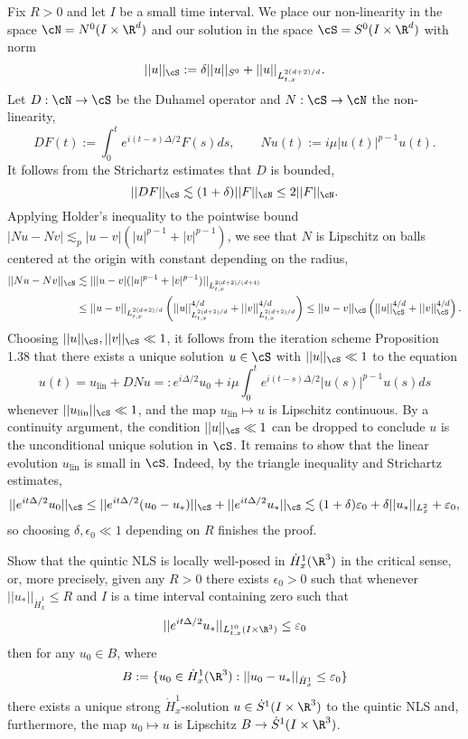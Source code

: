 \begin{solution}
	Fix $R > 0$ and let $I$ be a small time interval. We place our non-linearity in the space $\cN = N^0 (I \times \R^d)$ and our solution in the space $\cS = S^0 (I \times \R^d)$ with norm
		\[ || u||_{\cS} := \delta ||u||_{S^0} + ||u||_{L^{2(d + 2)/d}_{t, x}}. \]
	Let $D : \cN \to \cS$ be the Duhamel operator and $N: \cS \to \cN$ the non-linearity, 
		\[ DF (t) := \int_0^t e^{i(t - s) \Delta/2} F(s) ds, \qquad Nu (t) := i\mu |u(t)|^{p - 1} u(t). \]
	It follows from the Strichartz estimates that $D$ is bounded,
		\[ ||DF||_\cS \lesssim (1 + \delta)  ||F||_\cN \leq 2 ||F||_\cN. \]	
	Applying Holder's inequality to the pointwise bound $|Nu - Nv| \lesssim_p |u - v| (|u|^{p - 1} + |v|^{p - 1})$, we see that $N$ is Lipschitz on balls centered at the origin with constant depending on the radius,
	\begin{align*}
		|| Nu - Nv ||_\cN
				&\lesssim || |u - v| (|u|^{p - 1}  + |v|^{p - 1}) ||_{L^{2(d + 2)/(d + 4)}_{t, x}} \\
				&\leq ||u - v||_{L^{2(d + 2)/d}_{t, x}} \left( || u ||_{L^{2(d + 2)/d}_{t, x}}^{4/d} + || v||_{L^{2(d + 2)/d}_{t, x}}^{4/d} \right) \leq ||u - v||_{\cS} \left(||u||^{4/d}_\cS + ||v||_\cS^{4/d} \right).
	\end{align*}
	Choosing $||u||_\cS, ||v||_\cS \ll 1$, it follows from the iteration scheme Proposition 1.38 that there exists a unique solution $u \in \cS$ with $||u||_\cS \ll 1$ to the equation 
		\[ u(t) = u_{\text{lin}} + DN u =: e^{i \Delta/2} u_0 + i\mu \int_0^t e^{i (t - s) \Delta/2} |u(s)|^{p - 1} u(s) ds \]
	whenever $||u_{\text{lin}}||_\cS \ll 1$, and the map $u_{\text{lin}} \mapsto u$ is Lipschitz continuous. By a continuity argument, the condition $||u||_\cS \ll 1$ can be dropped to conclude $u$ is the unconditional unique solution in $\cS$. It remains to show that the linear evolution $u_{\text{lin}}$ is small in $\cS$. Indeed, by the triangle inequality and Strichartz estimates, 
		\[ ||e^{i t \Delta/2} u_0 ||_\cS \leq || e^{i t \Delta/2} (u_0 - u_*) ||_{\cS} + ||e^{i t \Delta/2}u_* ||_{\cS} \lesssim (1 + \delta) \epsilon_0 + \delta ||u_*||_{L^2_x} + \epsilon_0, \]
	so choosing $\delta, \epsilon_0 \ll 1$ depending on $R$ finishes the proof. 
\end{solution}


\begin{statement}
	Show that the quintic NLS is locally well-posed in $\dot H^1_x (\R^3)$ in the critical sense, or, more precisely, given any $R > 0$ there exists $\epsilon_0 > 0$ such that whenever $||u_*||_{\dot H^1_x} \leq R$ and $I$ is a time interval containing zero such that 
		\[ ||e^{it \Delta/2} u_*||_{L^{10}_{t, x} (I \times \R^3)} \leq \epsilon_0 \]
	then for any $u_0 \in B$, where
		\[ B:= \{u_0 \in \dot H^1_x (\R^3) : ||u_0 - u_*||_{\dot H^1_x} \leq \epsilon_0\} \]	
	there exists a unique strong $\dot H^1_x$-solution $u \in \dot S^1(I \times \R^3)$ to the quintic NLS and, furthermore, the map $u_0 \mapsto u$ is Lipschitz $B \to \dot S^1 (I \times \R^3)$. 
\end{statement}

